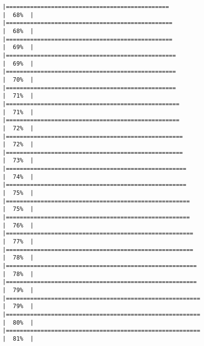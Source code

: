 \documentclass[
]{article}
\begin{document}
\begin{verbatim}
|===============================================                       |  68%  |                                                                              |================================================                      |  68%  |                                                                              |================================================                      |  69%  |                                                                              |=================================================                     |  69%  |                                                                              |=================================================                     |  70%  |                                                                              |=================================================                     |  71%  |                                                                              |==================================================                    |  71%  |                                                                              |==================================================                    |  72%  |                                                                              |===================================================                   |  72%  |                                                                              |===================================================                   |  73%  |                                                                              |====================================================                  |  74%  |                                                                              |====================================================                  |  75%  |                                                                              |=====================================================                 |  75%  |                                                                              |=====================================================                 |  76%  |                                                                              |======================================================                |  77%  |                                                                              |======================================================                |  78%  |                                                                              |=======================================================               |  78%  |                                                                              |=======================================================               |  79%  |                                                                              |========================================================              |  79%  |                                                                              |========================================================              |  80%  |                                                                              |========================================================              |  81%  |                                                                              
\end{verbatim}
\end{document}
